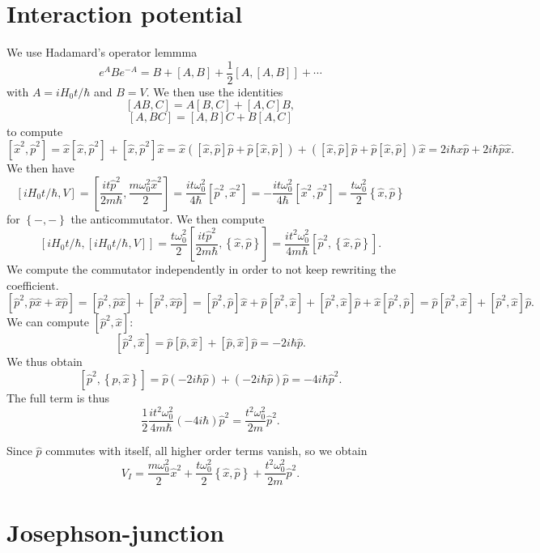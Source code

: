 \documentclass[11pt, letterpaper]{article}
\begin{document}
\section{Interaction potential}
We use Hadamard's operator lemmma
\[
	e^{A} Be^{-A}= B + [A,B] + \frac{1}{2} [A,[A,B]] + \cdots
\]
with $A=iH_0t/\hbar$ and $B=V $. We then use the identities
\[
	[AB,C]=A[B,C]+[A,C]B,
\]
\[
	[A,BC]=[A,B]C+B[A,C]
\]
to compute
\[
	[\hat{x} ^2,\hat{p} ^2]=\hat{x} [\hat{x} ,\hat{p} ^2] + [\hat{x} ,\hat{p} ^2]\hat{x} =\hat{x} \left( [\hat{x} ,\hat{p} ]\hat{p} +\hat{p} [\hat{x} ,\hat{p} ] \right) +\left( [\hat{x} ,\hat{p} ]\hat{p} +\hat{p} [\hat{x} ,\hat{p} ] \right)\hat{x} =2i\hbar\hat{x} \hat{p}+2i\hbar \hat{p} \hat{x} 
.\]
We then have
\[
	[iH_0t/\hbar,V]=\left[ \frac{i t\hat{p} ^2}{2m\hbar} ,\frac{m\omega _0^2 \hat{x} ^2}{2}  \right] =\frac{it\omega _0^2}{4\hbar} [\hat{p} ^2,\hat{x} ^2]= -\frac{it\omega _0^2}{4\hbar} [\hat{x} ^2,\hat{p} ^2]=\frac{t\omega _0^2}{2} \left\{ \hat{x} ,\hat{p}  \right\} 
\]
for $\left\{ -,- \right\} $ the anticommutator. We then compute
\[
	[iH_0t/\hbar,[iH_0t/\hbar,V]]= \frac{t\omega _0^2}{2} \left[\frac{it\hat{p} ^2}{2m\hbar}, \left\{ \hat{x},\hat{p}  \right\} \right]=\frac{it^2\omega _0^2}{4m\hbar} \left[ \hat{p} ^2,\left\{ \hat{x} ,\hat{p}  \right\}  \right] 
.\]
We compute the commutator independently in order to not keep rewriting the coefficient.
\[
	[\hat{p} ^2,\hat{p} \hat{x} +\hat{x} \hat{p} ]=[\hat{p} ^2,\hat{p} \hat{x} ]+[\hat{p} ^2,\hat{x} \hat{p} ]=[\hat{p} ^2,\hat{p} ]\hat{x} +\hat{p} [\hat{p} ^2,\hat{x} ]+[\hat{p} ^2,\hat{x} ]\hat{p} +\hat{x} [\hat{p} ^2,\hat{p} ]=\hat{p} [\hat{p} ^2,\hat{x} ]+[\hat{p} ^2,\hat{x} ]\hat{p} 
.\]
We can compute $[\hat{p} ^2,\hat{x} ]$:
\[
	[\hat{p} ^2,\hat{x} ]=\hat{p} [\hat{p} ,\hat{x} ]+[\hat{p} ,\hat{x} ]\hat{p} =-2i\hbar \hat{p} 
.\]
We thus obtain
\[
	[\hat{p} ^2, \left\{ \hat{p} ,\hat{x}  \right\} ]=\hat{p} (-2i\hbar \hat{p} ) + (-2i\hbar \hat{p} )\hat{p} =-4i\hbar \hat{p} ^2
.\]
The full term is thus
\[
	\frac{1}{2} \frac{it^2\omega _0^2}{4m\hbar} (-4i\hbar )\hat{p} ^2 = \frac{t^2\omega _0^2}{2m} \hat{p} ^2
.\]

Since $\hat{p} $ commutes with itself, all higher order terms vanish, so we obtain
\[
	V_I = \frac{m\omega _0^2}{2} \hat{x} ^2 + \frac{t\omega _0^2}{2} \left\{ \hat{x} ,\hat{p}  \right\} + \frac{t^2 \omega _0^2}{2m} \hat{p} ^2
.\]


\section{Josephson-junction}
\end{document}
